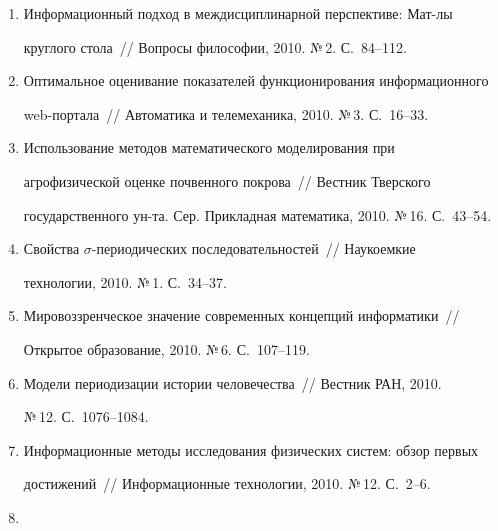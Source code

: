 \begin{enumerate}[1.]
С.~78--90.


\item {}


Информационный подход в междисциплинарной перспективе: Мат-лы 


круглого стола~/\!\!/ Вопросы философии, 2010. №\,2. С.~84--112.


\item {}


Оптимальное оценивание показателей функционирования информационного 


web-портала~/\!\!/ Автоматика и телемеханика, 2010. №\,3. С.~16--33.


\item {}


Использование методов математического моделирования при 


агрофизической оценке почвенного покрова~/\!\!/ Вестник Тверского 


государственного ун-та. Сер. Прикладная математика, 2010. №\,16. С.~43--54.


\item {}


Свойства $\sigma$-периодических последовательностей~/\!\!/  Наукоемкие 


технологии, 2010. №\,1. С.~34--37.


\item {}


Мировоззренческое значение современных концепций информатики~/\!\!/  


Открытое образование, 2010. №\,6. С.~107--119.


\item {}


Модели периодизации истории человечества~/\!\!/  Вестник РАН, 2010. 


№\,12. С.~1076--1084.


\item {}


Информационные методы исследования физических сис\-тем: обзор первых 


достижений~/\!\!/ Информационные технологии, 2010. №\,12. С.~2--6.


\item {}



\end{enumerate}
